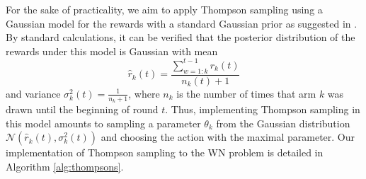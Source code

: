 \documentclass[10pt,journal,compsoc]{IEEEtran}
\begin{document}
	For the sake of practicality, we aim to apply Thompson sampling using a Gaussian model for the rewards with a standard Gaussian prior as suggested in \cite{agrawal2013further}. By standard calculations, it can be verified that the posterior distribution of the rewards under this model is Gaussian with mean 
	\begin{equation}
	\hat{r}_k(t) = \frac{\sum_{w=1:k}^{t-1} r_k(t) }{n_k(t) + 1}
	\nonumber
	\end{equation}
	and variance $\sigma_k^2(t) = \frac{1}{n_k + 1}$, where $n_k$ is the number of times that arm $k$ was drawn until the beginning of round $t$. Thus, implementing Thompson sampling in this model amounts to sampling a parameter $\theta_k$ from the Gaussian distribution $\mathcal{N}\left(\hat{r}_k(t),\sigma_k^2(t)\right)$ and choosing the action with the maximal parameter. Our implementation of Thompson sampling to the WN problem is detailed in Algorithm \ref{alg:thompsons}.	
	
\end{document}
